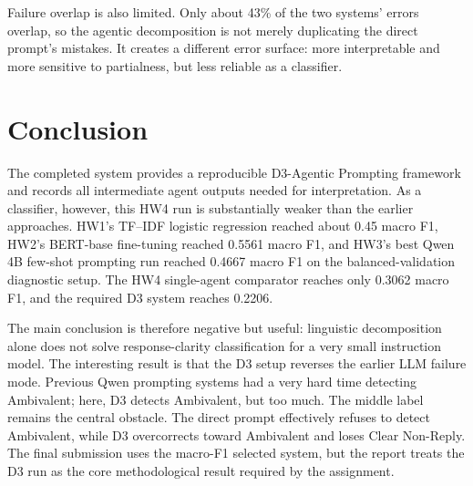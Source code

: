 \documentclass[12pt]{fphw}
\newcommand{\AMB}{Ambivalent}
\newcommand{\CNR}{Clear Non-Reply}
\begin{document}
Failure overlap is also limited. Only about 43\% of the two systems' errors overlap, so the agentic decomposition is not merely duplicating the direct prompt's mistakes. It creates a different error surface: more interpretable and more sensitive to partialness, but less reliable as a classifier.

\section{Conclusion}

The completed system provides a reproducible D3-Agentic Prompting framework and records all intermediate agent outputs needed for interpretation. As a classifier, however, this HW4 run is substantially weaker than the earlier approaches. HW1's TF--IDF logistic regression reached about 0.45 macro F1, HW2's BERT-base fine-tuning reached 0.5561 macro F1, and HW3's best Qwen 4B few-shot prompting run reached 0.4667 macro F1 on the balanced-validation diagnostic setup. The HW4 single-agent comparator reaches only 0.3062 macro F1, and the required D3 system reaches 0.2206.

The main conclusion is therefore negative but useful: linguistic decomposition alone does not solve response-clarity classification for a very small instruction model. The interesting result is that the D3 setup reverses the earlier LLM failure mode. Previous Qwen prompting systems had a very hard time detecting \AMB{}; here, D3 detects \AMB{}, but too much. The middle label remains the central obstacle. The direct prompt effectively refuses to detect \AMB{}, while D3 overcorrects toward \AMB{} and loses \CNR{}. The final submission uses the macro-F1 selected system, but the report treats the D3 run as the core methodological result required by the assignment.

\nocite{*}


\end{document}

